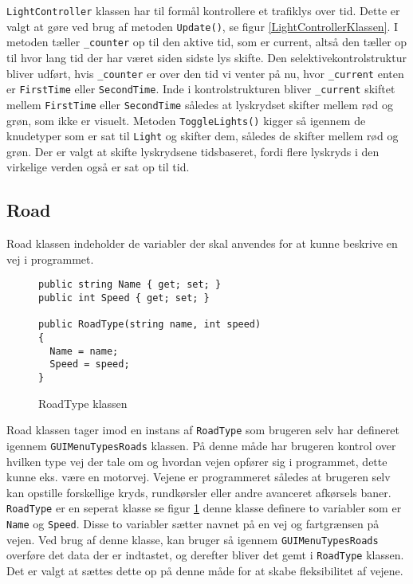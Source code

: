 \texttt{LightController} klassen har til formål kontrollere et trafiklys over tid. Dette er valgt at gøre ved brug af metoden \texttt{Update()}, se figur \ref{LightControllerKlassen}. I metoden tæller \texttt{\_counter} op til den aktive tid, som er current, altså den tæller op til hvor lang tid der har været siden sidste lys skifte. Den selektivekontrolstruktur bliver udført, hvis \texttt{\_counter} er over den tid vi venter på nu, hvor \texttt{\_current} enten er \texttt{FirstTime} eller \texttt{SecondTime}. Inde i kontrolstrukturen bliver \texttt{\_current} skiftet mellem \texttt{FirstTime} eller \texttt{SecondTime} således at lyskrydset skifter mellem rød og grøn, som ikke er visuelt. Metoden \texttt{ToggleLights()} kigger så igennem de knudetyper som er sat til \texttt{Light} og skifter dem, således de skifter mellem rød og grøn. Der er valgt at skifte lyskrydsene tidsbaseret, fordi flere lyskryds i den virkelige verden også er sat op til tid.

\subsection*{Road}
Road klassen indeholder de variabler der skal anvendes for at kunne beskrive en vej i programmet.

\begin{figure}[H]
\begin{lstlisting}
public string Name { get; set; }
public int Speed { get; set; }
        
public RoadType(string name, int speed)
{
  Name = name;
  Speed = speed;
}
\end{lstlisting}
\caption{RoadType klassen}\label{RoadTypeKlasse}
\end{figure}

Road klassen tager imod en instans af \texttt{RoadType} som brugeren selv har defineret igennem  \texttt{GUIMenuTypesRoads} klassen. På denne måde har brugeren kontrol over hvilken type vej der tale om og hvordan vejen opfører sig i programmet, dette kunne eks. være en motorvej. Vejene er programmeret således at brugeren selv kan opstille forskellige kryds, rundkørsler eller andre avanceret afkørsels baner. \texttt{RoadType} er en seperat klasse se figur \ref{RoadTypeKlasse} denne klasse definere to variabler som er \texttt{Name} og \texttt{Speed}. Disse to variabler sætter navnet på en vej og fartgrænsen på vejen. Ved brug af denne klasse, kan bruger så igennem \texttt{GUIMenuTypesRoads} overføre det data der er indtastet, og derefter bliver det gemt i \texttt{RoadType} klassen. Det er valgt at sættes dette op på denne måde for at skabe fleksibilitet af vejene.
